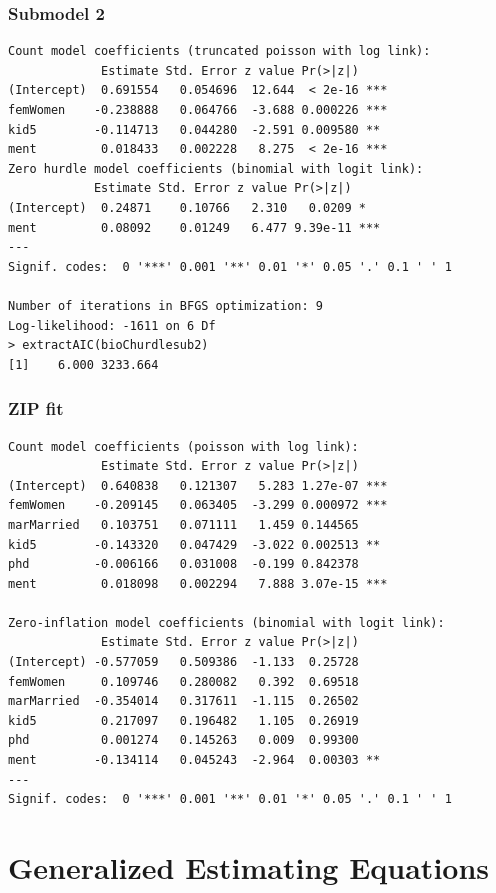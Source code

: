 \documentclass{beamer}
\begin{document}
\begin{frame}[fragile]
\frametitle{Submodel 2}
{\scriptsize
\begin{verbatim}
Count model coefficients (truncated poisson with log link):
             Estimate Std. Error z value Pr(>|z|)    
(Intercept)  0.691554   0.054696  12.644  < 2e-16 ***
femWomen    -0.238888   0.064766  -3.688 0.000226 ***
kid5        -0.114713   0.044280  -2.591 0.009580 ** 
ment         0.018433   0.002228   8.275  < 2e-16 ***
Zero hurdle model coefficients (binomial with logit link):
            Estimate Std. Error z value Pr(>|z|)    
(Intercept)  0.24871    0.10766   2.310   0.0209 *  
ment         0.08092    0.01249   6.477 9.39e-11 ***
---
Signif. codes:  0 '***' 0.001 '**' 0.01 '*' 0.05 '.' 0.1 ' ' 1 

Number of iterations in BFGS optimization: 9 
Log-likelihood: -1611 on 6 Df
> extractAIC(bioChurdlesub2)
[1]    6.000 3233.664
\end{verbatim}
}
\end{frame}

\begin{frame}[fragile]
\frametitle{ZIP fit}
{\scriptsize
\begin{verbatim}
Count model coefficients (poisson with log link):
             Estimate Std. Error z value Pr(>|z|)    
(Intercept)  0.640838   0.121307   5.283 1.27e-07 ***
femWomen    -0.209145   0.063405  -3.299 0.000972 ***
marMarried   0.103751   0.071111   1.459 0.144565    
kid5        -0.143320   0.047429  -3.022 0.002513 ** 
phd         -0.006166   0.031008  -0.199 0.842378    
ment         0.018098   0.002294   7.888 3.07e-15 ***

Zero-inflation model coefficients (binomial with logit link):
             Estimate Std. Error z value Pr(>|z|)   
(Intercept) -0.577059   0.509386  -1.133  0.25728   
femWomen     0.109746   0.280082   0.392  0.69518   
marMarried  -0.354014   0.317611  -1.115  0.26502   
kid5         0.217097   0.196482   1.105  0.26919   
phd          0.001274   0.145263   0.009  0.99300   
ment        -0.134114   0.045243  -2.964  0.00303 **
---
Signif. codes:  0 '***' 0.001 '**' 0.01 '*' 0.05 '.' 0.1 ' ' 1 
\end{verbatim}
}
\end{frame}

\section{Generalized Estimating Equations}
\label{GEE.section}
\end{document}
